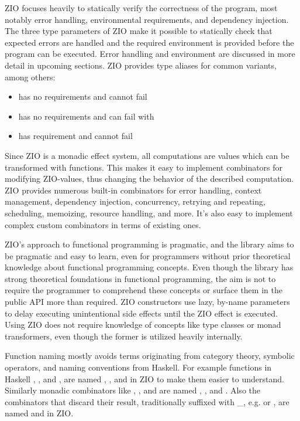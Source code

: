 ZIO focuses heavily to statically verify the correctness of the program, most notably error handling, environmental requirements, and dependency injection. The three type parameters of ZIO make it possible to statically check that expected errors are handled and the required environment is provided before the program can be executed. Error handling and environment are discussed in more detail in upcoming sections. ZIO provides type aliases for common variants, among others:
\begin{itemize}
    \item {} has no requirements and cannot fail
    \item {} has no requirements and can fail with 
    \item {} has requirement  and cannot fail
\end{itemize}

Since ZIO is a monadic effect system, all computations are values which can be transformed with functions. This makes it easy to implement combinators for modifying ZIO-values, thus changing the behavior of the described computation. ZIO provides numerous built-in combinators for error handling, context management, dependency injection, concurrency, retrying and repeating, scheduling, memoizing, resource handling, and more. It's also easy to implement complex custom combinators in terms of existing ones.

ZIO's approach to functional programming is pragmatic, and the library aims to be pragmatic and easy to learn, even for programmers without prior theoretical knowledge about functional programming concepts. Even though the library has strong theoretical foundations in functional programming, the aim is not to require the programmer to comprehend these concepts or surface them in the public API more than required. ZIO constructors use lazy, by-name parameters to delay executing unintentional side effects until the ZIO effect is executed. Using ZIO does not require knowledge of concepts like type classes or monad transformers, even though the former is utilized heavily internally.

Function naming mostly avoids terms originating from category theory, symbolic operators, and naming conventions from Haskell. For example functions in Haskell , , and , are named , , and  in ZIO to make them easier to understand. Similarly monadic combinators like , , and  are named , , and . Also the combinators that discard their result, traditionally suffixed with \_, e.g.  or , are named  and  in ZIO.

